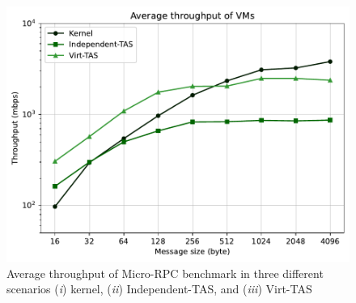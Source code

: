 \begin{figure}
    \centering
    \includegraphics[scale=0.6]{../results/multiplex.throughput.pdf}
    \caption{Average throughput of Micro-RPC benchmark in three different scenarios (\emph{i}) kernel, 
    (\emph{ii}) Independent-TAS, and (\emph{iii}) Virt-TAS}
    \label{fig:multiplex.throughput}
\end{figure}
